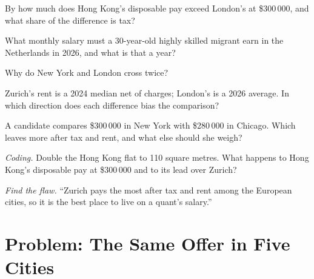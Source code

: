 \begin{exercise}[$\star$]\label{exo:in:locations:2}
By how much does Hong Kong's disposable pay exceed London's at \$300\,000, and what share of the difference is tax?
\end{exercise}

\begin{exercise}[$\star$]\label{exo:in:locations:3}
What monthly salary must a 30-year-old highly skilled migrant earn in the Netherlands in 2026, and what is that a year?
\end{exercise}

\begin{exercise}[$\star\star$]\label{exo:in:locations:4}
Why do New York and London cross twice?
\end{exercise}

\begin{exercise}[$\star\star$]\label{exo:in:locations:5}
Zurich's rent is a 2024 median net of charges; London's is a 2026 average. In which direction does each difference bias
the comparison?
\end{exercise}

\begin{exercise}[$\star\star$]\label{exo:in:locations:6}
A candidate compares \$300\,000 in New York with \$280\,000 in Chicago. Which leaves more after tax and rent, and what
else should she weigh?
\end{exercise}

\begin{exercise}[$\star\star\star$]\label{exo:in:locations:7}
\emph{Coding.} Double the Hong Kong flat to 110 square metres. What happens to Hong Kong's disposable pay at \$300\,000
and to its lead over Zurich?
\end{exercise}

\begin{exercise}[$\star\star\star$]\label{exo:in:locations:8}
\emph{Find the flaw.} ``Zurich pays the most after tax and rent among the European cities, so it is the best place to
live on a quant's salary.''
\end{exercise}

\section{Problem: The Same Offer in Five Cities}

